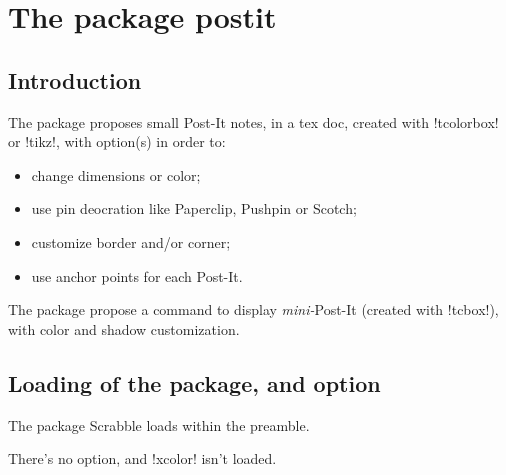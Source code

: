 \documentclass[english,a4paper,11pt]{article}
\begin{document}
\newpage

\section{The package postit}

\subsection{Introduction}

\begin{noteblock}
The package proposes small Post-It notes, in a \textsf{tex} doc, created with \packagetex!tcolorbox! or \packagetex!tikz!, with option(s) in order to:

\begin{itemize}
	\item change dimensions or color;
	\item use pin deocration like Paperclip, Pushpin or Scotch;
	\item customize border and/or corner;
	\item use anchor points for each Post-It.
\end{itemize}

The package propose a command to display \textit{mini-}Post-It (created with \motcletex!tcbox!), with color and shadow customization.
\end{noteblock}

\subsection{Loading of the package, and option}

\begin{importantblock}
The package Scrabble loads within the preamble.

There's no option, and \packagetex!xcolor! isn't loaded.
\end{importantblock}

\end{document}
